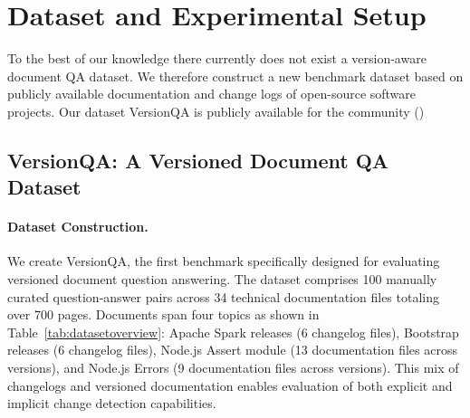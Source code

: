 \section{Dataset and Experimental Setup}
\label{sec:dataset}

To the best of our knowledge there currently does not exist a version-aware document QA dataset. We therefore construct a new benchmark dataset based on publicly available documentation and change logs of open-source software projects.
Our dataset VersionQA is publicly available for the community (\githuburl)

\subsection{VersionQA: A Versioned Document QA Dataset}

\paragraph{Dataset Construction.}
We create VersionQA, the first benchmark specifically designed for evaluating versioned document question answering. The dataset comprises 100 manually curated question-answer pairs across 34 technical documentation files totaling over 700 pages. Documents span four topics as shown in Table~\ref{tab:datasetoverview}: Apache Spark releases (6 changelog files), Bootstrap releases (6 changelog files), Node.js Assert module (13 documentation files across versions), and Node.js Errors (9 documentation files across versions). This mix of changelogs and versioned documentation enables evaluation of both explicit and implicit change detection capabilities.

\begin{table}[hb]
\centering
\small
\caption{VersionQA dataset composition with version ranges.}
\label{tab:datasetoverview}
\end{table}

